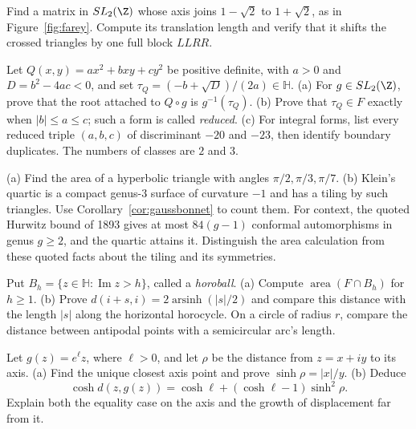 \begin{exercise}[$\star$]\label{ex:sqrt2axis}
Find a matrix in $SL_2(\Z)$ whose axis joins $1-\sqrt2$ to $1+\sqrt2$, as in Figure~\ref{fig:farey}. Compute its translation length and verify that it shifts the crossed triangles by one full block $LLRR$.
\end{exercise}

\begin{exercise}[$\star\star$]\label{ex:formsreduction}
Let $Q(x,y)=ax^2+bxy+cy^2$ be positive definite, with $a>0$ and $D=b^2-4ac<0$, and set $\tau_Q=(-b+\sqrt D)/(2a)\in\mathbb H$.
(a) For $g\in SL_2(\Z)$, prove that the root attached to $Q\circ g$ is $g^{-1}(\tau_Q)$.
(b) Prove that $\tau_Q\in F$ exactly when $|b|\le a\le c$; such a form is called \emph{reduced}.
(c) For integral forms, list every reduced triple $(a,b,c)$ of discriminant $-20$ and $-23$, then identify boundary duplicates. The numbers of classes are $2$ and $3$.
\end{exercise}

\begin{exercise}[$\star$]\label{ex:klein336}
(a) Find the area of a hyperbolic triangle with angles $\pi/2,\pi/3,\pi/7$.
(b) Klein's quartic is a compact genus-$3$ surface of curvature $-1$ and has a tiling by such triangles. Use Corollary~\ref{cor:gaussbonnet} to count them. For context, the quoted Hurwitz bound of 1893 gives at most $84(g-1)$ conformal automorphisms in genus $g\ge2$, and the quartic attains it. Distinguish the area calculation from these quoted facts about the tiling and its symmetries.
\end{exercise}

\begin{exercise}[$\star\star$]\label{ex:horocyclearea}
Put $B_h=\{z\in\mathbb H:\operatorname{Im}z>h\}$, called a \emph{horoball}.
(a) Compute $\operatorname{area}(F\cap B_h)$ for $h\ge1$.
(b) Prove $d(i+s,i)=2\operatorname{arsinh}(|s|/2)$ and compare this distance with the length $|s|$ along the horizontal horocycle. On a circle of radius $r$, compare the distance between antipodal points with a semicircular arc's length.
\end{exercise}

\begin{exercise}[$\star\star$]\label{ex:v9-ch09-axis-distance}
Let $g(z)=e^\ell z$, where $\ell>0$, and let $\rho$ be the distance from $z=x+iy$ to its axis.
(a) Find the unique closest axis point and prove $\sinh\rho=|x|/y$.
(b) Deduce
\[
\cosh d(z,g(z))=\cosh\ell+(\cosh\ell-1)\sinh^2\rho.
\]
Explain both the equality case on the axis and the growth of displacement far from it.
\end{exercise}

